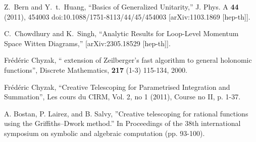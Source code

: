 \documentclass[a4paper,12pt]{article}
\numberwithin{equation}{section}
\numberwithin{figure}{section}
\begin{document}
\begin{thebibliography}{99}
  
Z.~Bern and Y.~t.~Huang,
``Basics of Generalized Unitarity,''
J. Phys. A \textbf{44} (2011), 454003
doi:10.1088/1751-8113/44/45/454003
[arXiv:1103.1869 [hep-th]].



C.~Chowdhury and K.~Singh,
``Analytic Results for Loop-Level Momentum Space Witten Diagrams,''
[arXiv:2305.18529 [hep-th]].

  Fr\'ed\'eric Chyzak, `` extension of
    Zeilberger's fast algorithm to general holonomic functions'',
Discrete Mathematics, {\bf 217} (1-3) 115-134, 2000.

 Fr\'ed\'eric Chyzak, ``Creative Telescoping for
  Parametrised Integration and Summation'',  Les cours du CIRM,  Vol. 2, no 1 (2011), Course no II, p. 1-37.

 A. Bostan, P. Lairez, and B. Salvy,
  ''Creative telescoping for rational functions using the
  Griffiths--Dwork method.'' In Proceedings of the 38th international
  symposium on symbolic and algebraic computation (pp. 93-100). 

	
	


\end{thebibliography}
\end{document}
